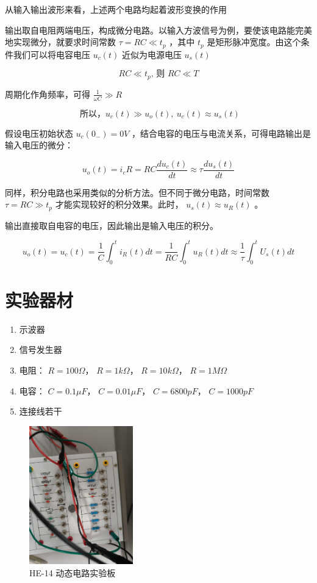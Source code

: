 \documentclass{article}
\begin{document}
从输入输出波形来看，上述两个电路均起着波形变换的作用

输出取自电阻两端电压，构成微分电路。以输入方波信号为例，要使该电路能完美地实现微分，就要求时间常数 $\tau=R C \ll t_p$ ，其中 $t_p$ 是矩形脉冲宽度。由这个条件我们可以将电容电压 $u_c(t)$ 近似为电源电压 $u_s(t)$

$$
R C \ll t_p \text {, 则 } R C \ll T
$$


周期化作角频率，可得 $\frac{1}{\omega C} \gg R$

$$
\text { 所以，} u_c(t) \gg u_o(t), ~ u_c(t) \approx u_s(t)
$$


假设电压初始状态 $u_c\left(0_{-}\right)=0 V$ ，结合电容的电压与电流关系，可得电路输出是输入电压的微分：

$$
u_o(t)=i_c R=R C \frac{d u_c(t)}{d t} \approx \tau \frac{d u_s(t)}{d t}
$$

同样，积分电路也采用类似的分析方法。但不同于微分电路，时间常数 $\tau=R C \gg t_p$ 才能实现较好的积分效果。此时， $u_s(t) \approx u_R(t)$ 。

输出直接取自电容的电压，因此输出是输入电压的积分。

$$
u_o(t)=u_c(t)=\frac{1}{C} \int_0^t i_R(t) d t=\frac{1}{R C} \int_0^t u_R(t) d t \approx \frac{1}{\tau} \int_0^t U_s(t) d t
$$

\section{实验器材}
\label{sec:equipment}
    \begin{enumerate}
        \item 示波器
        \item 信号发生器
        \item 电阻： $R=100\Omega$， $R=1k\Omega$， $R=10k\Omega$， $R=1M\Omega$
        \item 电容： $C=0.1\mu F$， $C=0.01\mu F$， $C=6800 p F$， $C=1000 p F$
        \item 连接线若干
    \end{enumerate} 

\begin{figure}[h]
    \centering
    \includegraphics[width=0.4\textwidth]{实验器材.jpg}
    \caption{HE-14 动态电路实验板}
    \label{fig:equipment}
\end{figure}
\end{document}
